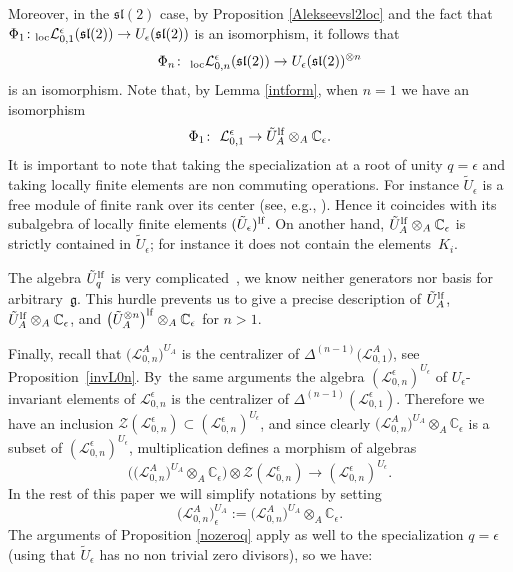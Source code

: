 \documentclass[pdftex]{sigma}%
\numberwithin{equation}{section}
\numberwithin{figure}{section}
\newcommand{\e}{\epsilon}
\newcommand{\mc}{\mathbb{C}}
\newcommand{\Ll}{{\mathcal L}}
\newcommand{\ra}{\rightarrow}
\begin{document}
Moreover, in the ${\mathfrak{sl}}(2)$ case, by Proposition \ref{Alekseevsl2loc} and the fact that $\Phi_1\colon {}_{\rm loc}\Ll_{0,1}^\e({\mathfrak{sl}}(2))\ra U_\e({\mathfrak{sl}}(2))$ is an isomorphism, it follows that
\begin{equation}\label{Phinlociso}
\Phi_n\colon\ {}_{\rm loc}\Ll_{0,n}^\e({\mathfrak{sl}}(2))\ra U_\e({\mathfrak{sl}}(2))^{\otimes n}
\end{equation}
is an isomorphism. Note that, by Lemma \ref{intform}, when $n=1$ we have an isomorphism
\begin{equation*}%
\Phi_1\colon \ \Ll_{0,1}^\epsilon\to \tilde{U}_A^{\rm lf}\otimes_A {\mathbb C}_{\epsilon}.
\end{equation*}
It is important to note that taking the specialization at a root of unity $q=\e$ and taking locally finite elements are non commuting operations. For instance $\tilde U_\epsilon$ is a free module of finite rank over its center (see, e.g., \cite[Section~9.2]{CP}). Hence it coincides with its subalgebra of locally finite elements $(\tilde U_\epsilon)^{\rm lf}$. On another hand, $\tilde{U}_A^{\rm lf}\otimes_A {\mathbb C}_{\epsilon}$ is strictly contained in $\tilde U_\epsilon$; for instance it does not contain the elements~$K_i$.

The algebra $\tilde U_q^{\rm lf}$ is very complicated~\cite{Jos}, we know neither generators nor basis for arbitrary~$\mathfrak{g}$. This hurdle prevents us to give a precise description of $\tilde U_A^{\rm lf}$, $\tilde{U}_A^{\rm lf}\otimes_A {\mathbb C}_{\epsilon}$, and $\big(\tilde U_A^{\otimes n}\big)^{\rm lf}\otimes_A {\mathbb C}_{\epsilon}$ for $n>1$.

Finally, recall that $\big(\Ll_{0,n}^A\big)^{U_A}$ is the centralizer of $\Delta^{(n-1)}\big(\Ll_{0,1}^A\big)$, see Proposition~\ref{invL0n}. By~the same arguments the algebra $(\Ll_{0,n}^\e)^{U_\e}$ of $U_\e$-invariant elements of $\Ll_{0,n}^\e$ is the centralizer of $\Delta^{(n-1)}(\Ll_{0,1}^\e)$. Therefore we have an inclusion $\mathcal{Z}(\Ll_{0,n}^\epsilon) \subset (\Ll_{0,n}^\e)^{U_\e}$, and since clearly $\big(\Ll_{0,n}^A\big)^{U_A}\allowbreak\otimes_A \mc_\e$ is a subset of $(\Ll_{0,n}^\e)^{U_\e}$, multiplication defines a morphism of algebras
\[
\big(\big(\Ll_{0,n}^A\big)^{U_A}\otimes_A \mc_\e\big) \otimes \mathcal{Z}(\Ll_{0,n}^\epsilon) \ra (\Ll_{0,n}^\e)^{U_\e}.
\]
In the rest of this paper we will simplify notations by setting
\begin{equation}\label{AepsL0n}
\big(\Ll_{0,n}^A\big)^{U_A}_\e := \big(\Ll_{0,n}^A\big)^{U_A}\otimes_A \mc_\e.
\end{equation}
The arguments of Proposition \ref{nozeroq} apply as well to the specialization $q=\epsilon$ (using that $\tilde U_\e$ has no non trivial zero divisors), so we have:
\end{document}

